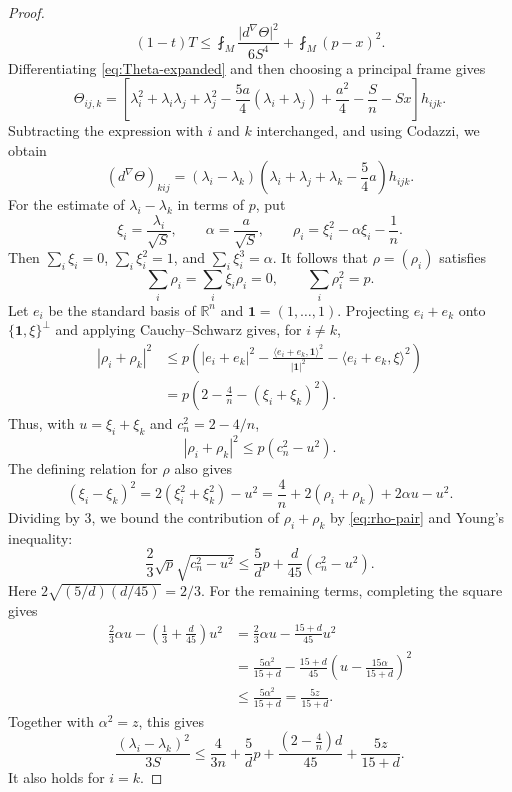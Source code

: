\documentclass[11pt,reqno]{amsart}
\numberwithin{equation}{section}
\newcommand{\ip}[2]{\langle #1,#2\rangle}
\newcommand{\norm}[1]{\lvert #1\rvert}
\begin{document}
\begin{proof}
\begin{equation}\label{eq:T-Weitz-final}
(1-t)T\le
\fint_M\frac{\norm{d^\nabla\Theta}^2}{6S^4}
+\fint_M(p-x)^2.
\end{equation}
Differentiating \eqref{eq:Theta-expanded} and then choosing a principal frame gives
\[
\Theta_{ij,k}
=\left[\lambda_i^2+\lambda_i\lambda_j+\lambda_j^2
-\frac{5a}{4}(\lambda_i+\lambda_j)
+\frac{a^2}{4}-\frac Sn-Sx\right]h_{ijk}.
\]
Subtracting the expression with $i$ and $k$ interchanged, and using Codazzi,
we obtain
\[
(d^\nabla\Theta)_{kij}
=(\lambda_i-\lambda_k)
\left(\lambda_i+\lambda_j+\lambda_k-\frac54a\right)h_{ijk}.
\]
For the estimate of $\lambda_i-\lambda_k$ in terms of $p$, put
\[
\xi_i=\frac{\lambda_i}{\sqrt S},
\qquad
\alpha=\frac a{\sqrt S},
\qquad
\rho_i=\xi_i^2-\alpha\xi_i-\frac1n.
\]
Then $\sum_i\xi_i=0$, $\sum_i\xi_i^2=1$, and $\sum_i\xi_i^3=\alpha$.
It follows that $\rho=(\rho_i)$ satisfies
\[
\sum_i\rho_i=\sum_i\xi_i\rho_i=0,
\qquad \sum_i\rho_i^2=p.
\]
Let $e_i$ be the standard basis of $\mathbb R^n$ and $\mathbf1=(1,\ldots,1)$. Projecting $e_i+e_k$ onto $\{\mathbf1,\xi\}^{\perp}$ and applying Cauchy--Schwarz gives, for $i\ne k$,
\begin{align*}
|\rho_i+\rho_k|^2
&\le p\left(\norm{e_i+e_k}^2
-\frac{\ip{e_i+e_k}{\mathbf1}^2}{\norm{\mathbf1}^2}
-\ip{e_i+e_k}{\xi}^2\right)\\
&=p\left(2-\frac4n-(\xi_i+\xi_k)^2\right).
\end{align*}
Thus, with $u=\xi_i+\xi_k$ and $c_n^2=2-4/n$,
\begin{equation}\label{eq:rho-pair}
|\rho_i+\rho_k|^2\le p(c_n^2-u^2).
\end{equation}
The defining relation for $\rho$ also gives
\[
(\xi_i-\xi_k)^2
=2(\xi_i^2+\xi_k^2)-u^2
=\frac4n+2(\rho_i+\rho_k)+2\alpha u-u^2.
\]
Dividing by $3$, we bound the contribution of $\rho_i+\rho_k$ by \eqref{eq:rho-pair} and Young's inequality:
\[
\frac23\sqrt p\sqrt{c_n^2-u^2}
\le\frac5d p+\frac d{45}(c_n^2-u^2).
\]
Here $2\sqrt{(5/d)(d/45)}=2/3$. For the remaining terms, completing the square gives
\begin{align*}
\frac23\alpha u-\left(\frac13+\frac d{45}\right)u^2
&=\frac23\alpha u-\frac{15+d}{45}u^2\\
&=\frac{5\alpha^2}{15+d}
-\frac{15+d}{45}
\left(u-\frac{15\alpha}{15+d}\right)^2\\
&\le\frac{5\alpha^2}{15+d}
=\frac{5z}{15+d}.
\end{align*}
Together with $\alpha^2=z$, this gives
\begin{equation}\label{eq:pairwise-final}
\frac{(\lambda_i-\lambda_k)^2}{3S}
\le \frac4{3n}+\frac5d p
+\frac{(2-\frac4n)d}{45}+\frac{5z}{15+d}.
\end{equation}
It also holds for $i=k$.


\end{proof}
\end{document}
